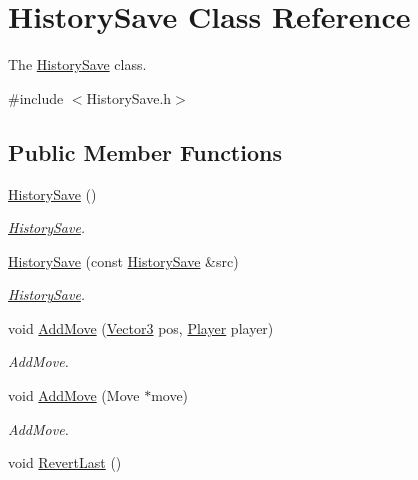\hypertarget{classHistorySave}{\section{History\-Save Class Reference}
\label{classHistorySave}
}


The \hyperlink{classHistorySave}{History\-Save} class.  




{\ttfamily \#include $<$History\-Save.\-h$>$}

\subsection*{Public Member Functions}
\begin{DoxyCompactItemize}
\item 
\hypertarget{classHistorySave_a1f76c15dd7a3b9e27a8c66897141ee16}{\hyperlink{classHistorySave_a1f76c15dd7a3b9e27a8c66897141ee16}{History\-Save} ()}\label{classHistorySave_a1f76c15dd7a3b9e27a8c66897141ee16}

\begin{DoxyCompactList}\small\item\em \hyperlink{classHistorySave}{History\-Save}. \end{DoxyCompactList}\item 
\hyperlink{classHistorySave_ac0766707b25e837d00e6e4b48bf2860c}{History\-Save} (const \hyperlink{classHistorySave}{History\-Save} \&src)
\begin{DoxyCompactList}\small\item\em \hyperlink{classHistorySave}{History\-Save}. \end{DoxyCompactList}\item 
void \hyperlink{classHistorySave_a4d10cac993d69d8f98f9c32eb7ae4a2d}{Add\-Move} (\hyperlink{structVector3}{Vector3} pos, \hyperlink{classPlayer}{Player} player)
\begin{DoxyCompactList}\small\item\em Add\-Move. \end{DoxyCompactList}\item 
void \hyperlink{classHistorySave_a58606fc0129831834138b5f0f2ef4bd1}{Add\-Move} (Move $\ast$move)
\begin{DoxyCompactList}\small\item\em Add\-Move. \end{DoxyCompactList}\item 
\hypertarget{classHistorySave_a4adce01fc1a4deb3a80d7ac5e3a38860}{void \hyperlink{classHistorySave_a4adce01fc1a4deb3a80d7ac5e3a38860}{Revert\-Last} ()}\label{classHistorySave_a4adce01fc1a4deb3a80d7ac5e3a38860}


\end{DoxyCompactItemize}

